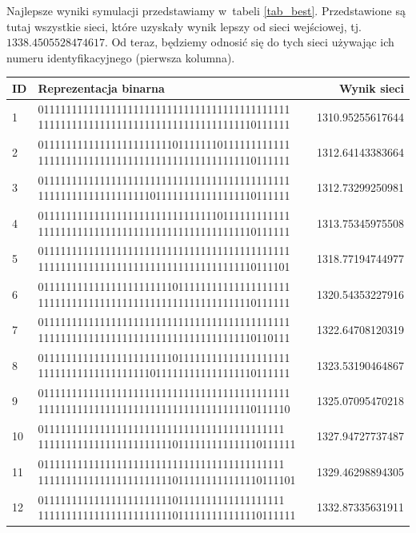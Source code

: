 \documentclass[twoside,12pt]{report}
\begin{document}
Najlepsze wyniki symulacji przedstawiamy w~tabeli \ref{tab_best}. Przedstawione są tutaj wszystkie sieci, które uzyskały wynik lepszy od sieci wejściowej, tj. $1338.4505528474617$. Od teraz, będziemy odnosić się do tych sieci używając ich numeru identyfikacyjnego (pierwsza kolumna).

\begin{minipage}{\linewidth}
\label{tab_best} 
\begin{tabularx}{\linewidth}{ | l | X | r | }
	\hline
	ID & Reprezentacja binarna & Wynik sieci \\
	\hline
	1 & 011111111111111111111111111111111111111111111 	111111111111111111111111111111111111110111111 & 1310.95255617644 \\ \hline
	2 & 011111111111111111111111011111110111111111111 111111111111111111111111111111111111110111111 & 1312.64143383664 \\ \hline
	3 & 011111111111111111111111111111111111111111111 111111111111111111110111111111111111110111111 & 1312.73299250981 \\ \hline
	4 & 011111111111111111111111111111110111111111111 111111111111111111111111111111111111110111111 & 1313.75345975508 \\ \hline
	5 & 011111111111111111111111111111111111111111111 111111111111111111111111111111111111110111101 & 1318.77194744977 \\ \hline
	6 & 011111111111111111111111011111111111111111111 111111111111111111111111111111111111110111111 & 1320.54353227916 \\ \hline
	7 & 011111111111111111111111111111111111111111111 111111111111111111111111111111111111110110111 & 1322.64708120319 \\ \hline
	8 & 011111111111111111111111011111111111111111111 111111111111111111110111111111111111110111111 & 1323.53190464867 \\ \hline
	9 & 011111111111111111111111111111111111111111111 111111111111111111111111111111111111110111110 & 1325.07095470218 \\ \hline
	10 & 01111111111111111111111111111111111111111111 1111111111111111111111110111111111111110111111 & 1327.94727737487 \\ \hline
	11 & 01111111111111111111111111111111111111111111 1111111111111111111111110111111111111110111101 & 1329.46298894305 \\ \hline
	12 & 01111111111111111111111101111111111111111111 1111111111111111111111110111111111111110111111 & 1332.87335631911 \\ \hline

\end{tabularx}
\end{minipage}
\end{document}

